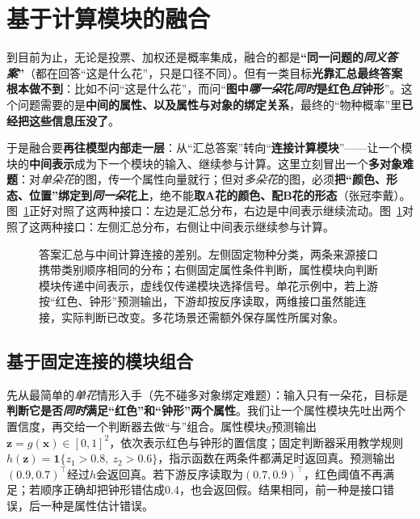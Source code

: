 \section{基于计算模块的融合}
\label{sec:ket-integration-modules}

到目前为止，无论是投票、加权还是概率集成，融合的都是\textbf{“同一问题的\emph{同义答案}”}（都在回答“这是什么花”，只是口径不同）。但有一类目标\textbf{光靠汇总最终答案根本做不到}：比如不问“这是什么花”，而问“\textbf{图中\emph{哪一朵}花\emph{同时}是红色\emph{且}钟形}”。这个问题需要的是\textbf{中间的属性、以及属性与对象的绑定关系}，最终的“物种概率”里\textbf{已经把这些信息压没了}。

于是融合要\textbf{再往模型内部走一层}：从“汇总答案”转向“\textbf{连接计算模块}”——让一个模块的\textbf{中间表示}成为下一个模块的输入、继续参与计算。这里立刻冒出一个\textbf{多对象难题}：对\emph{单朵花}的图，传一个属性向量就行；但对\emph{多朵花}的图，必须\textbf{把“颜色、形态、位置”绑定到\emph{同一朵}花上}，绝不能\textbf{取A花的颜色、配B花的形态}（张冠李戴）。图~\ref{fig:ket-integration-interfaces}正好对照了这两种接口：左边是汇总分布，右边是中间表示继续流动。图~\ref{fig:ket-integration-interfaces}对照了这两种接口：左侧汇总分布，右侧让中间表示继续参与计算。

\begin{figure}[htbp]
  \centering
  
  \caption{答案汇总与中间计算连接的差别。左侧固定物种分类，两条来源接口携带类别顺序相同的分布；右侧固定属性条件判断，属性模块向判断模块传递中间表示，虚线仅传递模块选择信号。单花示例中，若上游按“红色、钟形”预测输出，下游却按反序读取，两维接口虽然能连接，实际判断已改变。多花场景还需额外保存属性所属对象。}
  \label{fig:ket-integration-interfaces}
\end{figure}

\subsection{基于固定连接的模块组合}
\label{sec:ket-integration-fixed-modules}

先从最简单的\emph{单花}情形入手（先不碰多对象绑定难题）：输入只有一朵花，目标是\textbf{判断它是否\emph{同时}满足“红色”和“钟形”两个属性}。我们让一个属性模块先吐出两个置信度，再交给一个判断器去做“与”组合。属性模块$g$预测输出$\bm{z}=g(\bm{x})\in[0,1]^2$，依次表示红色与钟形的置信度；固定判断器采用教学规则$h(\bm{z})=\mathbf{1}\{z_1>0.8,\ z_2>0.6\}$，指示函数在两条件都满足时返回真。预测输出$(0.9,0.7)^\top$经过$h$会返回真。若下游反序读取为$(0.7,0.9)^\top$，红色阈值不再满足；若顺序正确却把钟形错估成$0.4$，也会返回假。结果相同，前一种是接口错误，后一种是属性估计错误。

